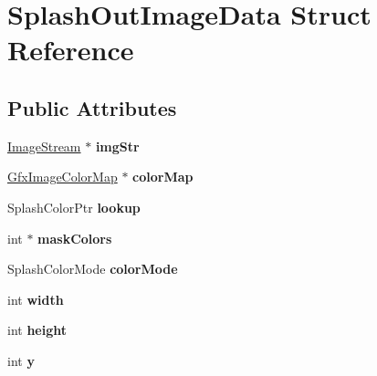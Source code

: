 \hypertarget{struct_splash_out_image_data}{}\section{Splash\+Out\+Image\+Data Struct Reference}
\label{struct_splash_out_image_data}
\subsection*{Public Attributes}
\begin{DoxyCompactItemize}
\item 
\mbox{\label{struct_splash_out_image_data_a828dbec5d79720267ac132a7f138fea1}} 
\hyperlink{class_image_stream}{Image\+Stream} $\ast$ {\bfseries img\+Str}
\item 
\mbox{\label{struct_splash_out_image_data_ac7e7d29cdd7a1a75f49a3166ecbe644a}} 
\hyperlink{class_gfx_image_color_map}{Gfx\+Image\+Color\+Map} $\ast$ {\bfseries color\+Map}
\item 
\mbox{\label{struct_splash_out_image_data_a085a7f51cc9236bb90a505b7a52a637c}} 
Splash\+Color\+Ptr {\bfseries lookup}
\item 
\mbox{\label{struct_splash_out_image_data_a071844ef17ca1572374c786ec0d86aa7}} 
int $\ast$ {\bfseries mask\+Colors}
\item 
\mbox{\label{struct_splash_out_image_data_ae5cee6340b6dad987a5a6435e164819d}} 
Splash\+Color\+Mode {\bfseries color\+Mode}
\item 
\mbox{\label{struct_splash_out_image_data_a22ab0a20317d5da47c43be8506208976}} 
int {\bfseries width}
\item 
\mbox{\label{struct_splash_out_image_data_acc5bbb4d390f5bf3a29aa660f637119b}} 
int {\bfseries height}
\item 
\mbox{\label{struct_splash_out_image_data_af47e9ce5db5aabd2abb639795025e3d9}} 
int {\bfseries y}
\item 

\end{DoxyCompactItemize}
